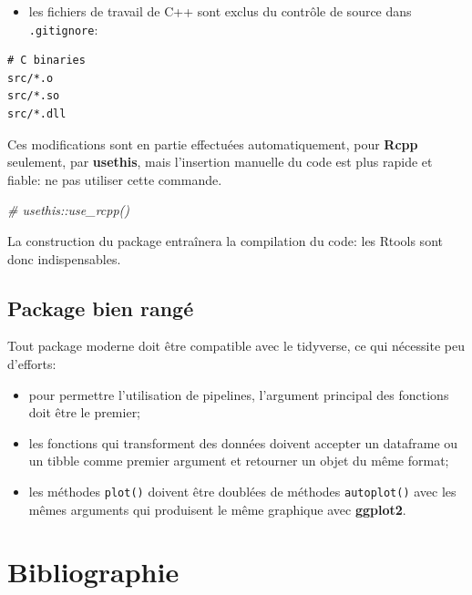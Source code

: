\documentclass[
  12pt,
  french,
  a4paper,
  extrafontsizes,onecolumn,openright
  ]{memoir}
\newenvironment{Shaded}{\begin{snugshade}}{\end{snugshade}}
\newcommand{\CommentTok}[1]{\textcolor[rgb]{0.56,0.35,0.01}{\textit{#1}}}
\providecommand{\tightlist}{%
  \setlength{\itemsep}{0pt}\setlength{\parskip}{0pt}}
\begin{document}
\normalsize

\begin{itemize}
\tightlist
\item
  les fichiers de travail de C++ sont exclus du contrôle de source dans \texttt{.gitignore}:
\end{itemize}

\begin{verbatim}
# C binaries
src/*.o
src/*.so
src/*.dll
\end{verbatim}

Ces modifications sont en partie effectuées automatiquement, pour \textbf{Rcpp} seulement, par \textbf{usethis}, mais l'insertion manuelle du code est plus rapide et fiable: ne pas utiliser cette commande.

\scriptsize

\begin{Shaded}
\begin{Highlighting}[]
\CommentTok{# usethis::use_rcpp()}
\end{Highlighting}
\end{Shaded}

\normalsize

La construction du package entraînera la compilation du code: les Rtools sont donc indispensables.

\hypertarget{package-bien-ranguxe9}{%
\subsection{Package bien rangé}\label{package-bien-ranguxe9}}

Tout package moderne doit être compatible avec le tidyverse, ce qui nécessite peu d'efforts:

\begin{itemize}
\tightlist
\item
  pour permettre l'utilisation de pipelines, l'argument principal des fonctions doit être le premier;
\item
  les fonctions qui transforment des données doivent accepter un dataframe ou un tibble comme premier argument et retourner un objet du même format;
\item
  les méthodes \texttt{plot()} doivent être doublées de méthodes \texttt{autoplot()} avec les mêmes arguments qui produisent le même graphique avec \textbf{ggplot2}.
\end{itemize}

\hypertarget{bibliographie-1}{%
\section{Bibliographie}\label{bibliographie-1}}
\end{document}
